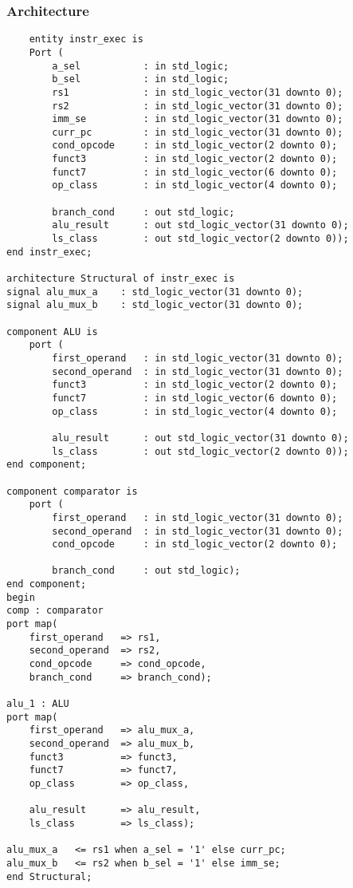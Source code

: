 \subsubsection{Architecture}
\begin{code}
\label{code:IE_code}  
\begin{verbatim}
    entity instr_exec is
    Port (
        a_sel           : in std_logic;
        b_sel           : in std_logic;    
        rs1             : in std_logic_vector(31 downto 0);
        rs2             : in std_logic_vector(31 downto 0);
        imm_se          : in std_logic_vector(31 downto 0);
        curr_pc         : in std_logic_vector(31 downto 0);
        cond_opcode     : in std_logic_vector(2 downto 0);
        funct3          : in std_logic_vector(2 downto 0);
        funct7          : in std_logic_vector(6 downto 0);
        op_class        : in std_logic_vector(4 downto 0);
        
        branch_cond     : out std_logic;
        alu_result      : out std_logic_vector(31 downto 0);
        ls_class        : out std_logic_vector(2 downto 0));
end instr_exec;

architecture Structural of instr_exec is
signal alu_mux_a    : std_logic_vector(31 downto 0);
signal alu_mux_b    : std_logic_vector(31 downto 0);

component ALU is
    port (
        first_operand   : in std_logic_vector(31 downto 0);
        second_operand  : in std_logic_vector(31 downto 0);
        funct3          : in std_logic_vector(2 downto 0);
        funct7          : in std_logic_vector(6 downto 0);
        op_class        : in std_logic_vector(4 downto 0);
        
        alu_result      : out std_logic_vector(31 downto 0);
        ls_class        : out std_logic_vector(2 downto 0));
end component;

component comparator is
    port ( 
        first_operand   : in std_logic_vector(31 downto 0);
        second_operand  : in std_logic_vector(31 downto 0);
        cond_opcode     : in std_logic_vector(2 downto 0);
        
        branch_cond     : out std_logic);
end component;
begin
comp : comparator 
port map(
    first_operand   => rs1,
    second_operand  => rs2,
    cond_opcode     => cond_opcode,
    branch_cond     => branch_cond); 

alu_1 : ALU
port map(
    first_operand   => alu_mux_a,
    second_operand  => alu_mux_b,
    funct3          => funct3,
    funct7          => funct7,
    op_class        => op_class,
        
    alu_result      => alu_result,
    ls_class        => ls_class);

alu_mux_a   <= rs1 when a_sel = '1' else curr_pc;
alu_mux_b   <= rs2 when b_sel = '1' else imm_se;
end Structural;
\end{verbatim}
\end{code}
\newpage


